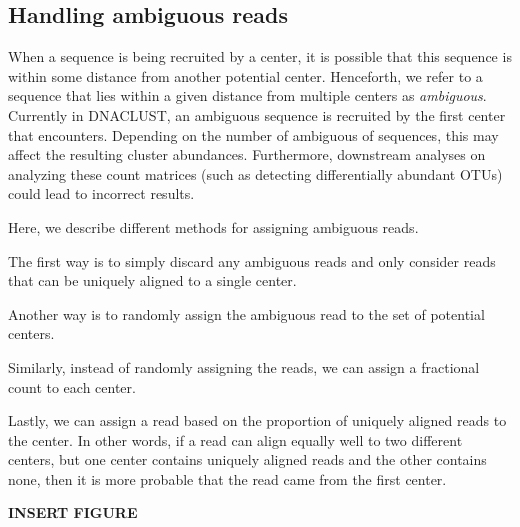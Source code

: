 \subsection{Handling ambiguous reads}

When a sequence is being recruited by a center, it is possible that this sequence is within some distance from another potential center.
Henceforth, we refer to a sequence that lies within a given distance from multiple centers as \emph{ambiguous}.
Currently in DNACLUST, an ambiguous sequence is recruited by the first center that encounters.
Depending on the number of ambiguous of sequences, this may affect the resulting cluster abundances.
Furthermore, downstream analyses on analyzing these count matrices (such as detecting differentially abundant OTUs) could lead to incorrect results.

Here, we describe different methods for assigning ambiguous reads.

The first way is to simply discard any ambiguous reads and only consider reads that can be uniquely aligned to a single center.

Another way is to randomly assign the ambiguous read to the set of potential centers.

Similarly, instead of randomly assigning the reads, we can assign a fractional count to each center.

Lastly, we can assign a read based on the proportion of uniquely aligned reads to the center.  In other words, if a read can align equally well to two different centers, but one center contains uniquely aligned reads and the other contains none, then it is more probable that the read came from the first center.

{\bf INSERT FIGURE}
